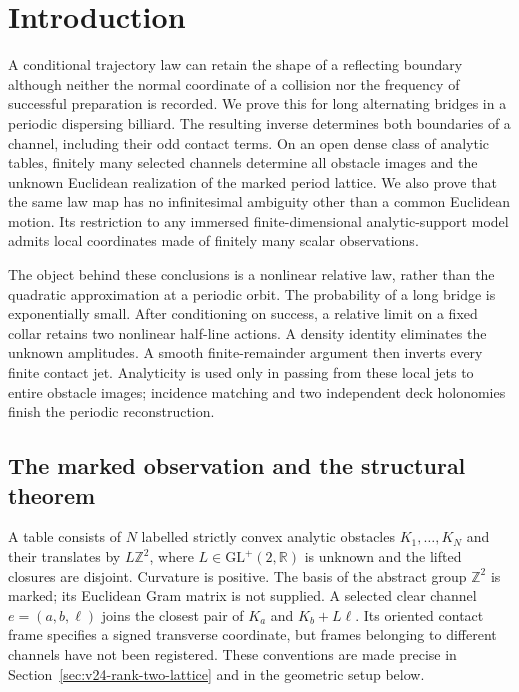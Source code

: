 \section{Introduction}
\label{sec:v48-introduction}

A conditional trajectory law can retain the shape of a reflecting boundary
although neither the normal coordinate of a collision nor the frequency of
successful preparation is recorded.  We prove this for long alternating
bridges in a periodic dispersing billiard.  The resulting inverse determines
both boundaries of a channel, including their odd contact terms.  On an open
dense class of analytic tables, finitely many selected channels determine
all obstacle images and the unknown Euclidean realization of the marked
period lattice.  We also prove that the same law map has no infinitesimal
ambiguity other than a common Euclidean motion.  Its restriction to any
immersed finite-dimensional analytic-support model admits local coordinates
made of finitely many scalar observations.

The object behind these conclusions is a nonlinear relative law, rather
than the quadratic approximation at a periodic orbit.  The probability of
a long bridge is exponentially small.  After conditioning on success, a
relative limit on a fixed collar retains two nonlinear half-line actions.
A density identity eliminates the unknown amplitudes.  A smooth
finite-remainder argument then inverts every finite contact jet.  Analyticity
is used only in passing from these local jets to entire obstacle images;
incidence matching and two independent deck holonomies finish the periodic
reconstruction.

\subsection{The marked observation and the structural theorem}

A table consists of $N$ labelled strictly convex analytic obstacles
$K_1,\ldots,K_N$ and their translates by $L\mathbb Z^2$, where
$L\in\mathrm{GL}^+(2,\mathbb R)$ is unknown and the lifted closures are
disjoint.  Curvature is positive.  The basis of the abstract group
$\mathbb Z^2$ is marked; its Euclidean Gram matrix is not supplied.  A
selected clear channel $e=(a,b,\ell)$ joins the closest pair of
$K_a$ and $K_b+L\ell$.  Its oriented contact frame specifies a signed
transverse coordinate, but frames belonging to different channels have not
been registered.  These conventions are made precise in
Section~\ref{sec:v24-rank-two-lattice} and in the geometric setup below.

